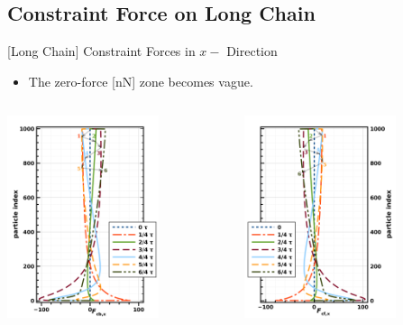 \documentclass[t,presentation]{beamer}
\begin{document}
\subsection{Constraint Force on Long Chain}
\label{sec:org57f7451}
\begin{frame}[label={sec:orgf336b32}]{[Long Chain] Constraint  Forces  in \(x-\) Direction}
\begin{itemize}
\item The zero-force  [nN] zone becomes vague.
\end{itemize}
\begin{columns}[c]
\begin{column}{.45\textwidth}
\centering
\includegraphics[width=1.75in]{figures/cXpvdf1000FC1.png}\par
\end{column}
\begin{column}{.45\textwidth} %
\centering
\includegraphics[width=1.75in]{figures/cXpvdf1000FC2.png}\par
\end{column}
\end{columns}
\end{frame}
\end{document}
